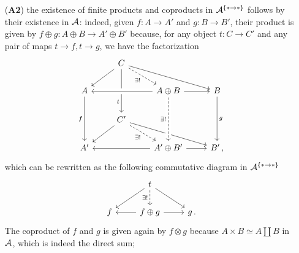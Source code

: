 \begin{ex}
\begin{itemize}
        \item[(\textbf{A2})] the existence of finite products
        and coproducts in $\mathcal{A}^{\{\ast \to \ast\}}$ 
        follows by their existence in $\mathcal{A}$: 
        indeed, given $f:A \to A'$ and $g:B \to B'$,
        their product is given by $f \oplus g : A \oplus B \to A' \oplus B'$
        because, for any object $t:C \to C'$ and 
        any pair of maps $t \to f, t \to g$, we have the factorization
        \begin{equation*}
            \begin{tikzcd}
                   & C \arrow[ld] \arrow[rrd] \arrow[dd, "t"', near end] \arrow[rd, "\exists !"', dashed] &                                                                  &                   \\
A \arrow[dd, "f"'] &                                                                            & A \oplus B \arrow[ll, crossing over] \arrow[r]  & B \arrow[dd, "g"] \\
                   & C' \arrow[ld] \arrow[rrd] \arrow[rd, "\exists !"', dashed]                 &                                                                  &                   \\
A'                 &                                                                            & A' \oplus B' \arrow[ll] \arrow[r] \arrow[from=uu, "\exists !"', dashed, crossing over]                               & B'         \,,          
\end{tikzcd}
        \end{equation*}
        which can be rewritten as the following commutative diagram
        in $\mathcal{A}^{\{\ast \to \ast\}}$
        \begin{equation*}
            \begin{tikzcd}
                & t \ar[d, dashed, "\exists !"'] \ar[dr] \ar[dl] & \\
                f & f \oplus g \ar[l] \ar[r] & g\,.
            \end{tikzcd}
        \end{equation*}
        The coproduct of $f$ and $g$ is given again by $f \otimes g$
        because $A \times B \simeq A \amalg B$ in $\mathcal{A}$, which is indeed the direct sum;


\end{itemize}
\end{ex}

